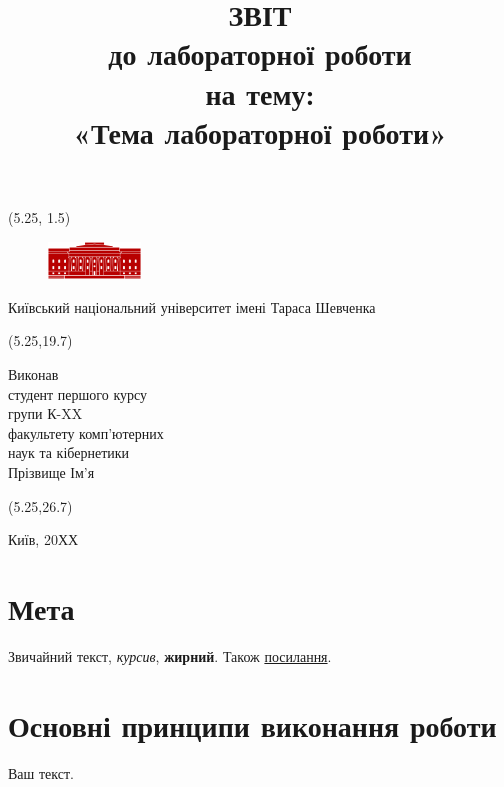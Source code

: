 \documentclass[12pt]{extreport}
\title{\textbf{ЗВІТ}\\[0.5ex]\Large до лабораторної роботи \\на тему:\\\huge «Тема лабораторної роботи»}
\author{}
\date{}
\begin{document}
\begin{textblock}{10}(5.25, 1.5)
    \begin{center}
    \begin{figure}[ht]
        \centering
        \includegraphics[width=0.22\textwidth]{KNU2.png}
    \end{figure}
    \noindent\Large Київський національний університет імені Тараса Шевченка
\end{center}
\end{textblock}

\begin{textblock}{13}(5.25,19.7)
    \begin{flushright}
        \noindent\Large
        Виконав\\[1ex]
        студент першого курсу\\
        групи К-XX\\
        факультету комп'ютерних\\наук та кібернетики\\[1ex]
        Прізвище Ім'я
    \end{flushright}
\end{textblock}

\begin{textblock}{10}(5.25,26.7)
    \begin{center}
        \noindent\Large
        Київ, 20ХХ
    \end{center}
\end{textblock}

\maketitle

\large %

\section*{Мета}
Звичайний текст, \textit{курсив}, \textbf{жирний}. Також \href{https://github.com/vladyslavpavlenko}{посилання}.

\section*{Основні принципи виконання роботи}
Ваш текст.
\end{document}

